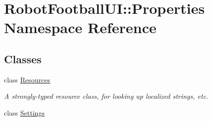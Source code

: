 \hypertarget{namespace_robot_football_u_i_1_1_properties}{
\section{Robot\-Football\-UI::Properties Namespace Reference}
\label{namespace_robot_football_u_i_1_1_properties}
}


\subsection*{Classes}
\begin{CompactItemize}
\item 
class \hyperlink{class_robot_football_u_i_1_1_properties_1_1_resources}{Resources}
\begin{CompactList}\small\item\em A strongly-typed resource class, for looking up localized strings, etc. \item\end{CompactList}\item 
class \hyperlink{class_robot_football_u_i_1_1_properties_1_1_settings}{Settings}
\end{CompactItemize}
